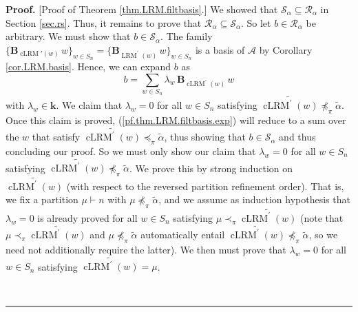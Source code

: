 \documentclass[submission]{FPSAC2026}
\newcommand{\kk}{\mathbf{k}} %
\newcommand{\cLRM}{\operatorname{cLRM}}
\newenvironment{proof}[1][Proof]{\noindent\textbf{#1.} }{\ \rule{0.5em}{0.5em}}
\begin{document}
\begin{proof}
[Proof of Theorem \ref{thm.LRM.filtbasis}.] We showed that $\mathcal{S}%
_{\alpha}\subseteq\mathcal{R}_{\alpha}$ in Section \ref{sec.rs}. Thus, it
remains to prove that $\mathcal{R}_{\alpha}\subseteq\mathcal{S}_{\alpha}$. So
let $b\in\mathcal{R}_{\alpha}$ be arbitrary. We must show that $b\in
\mathcal{S}_{\alpha}$.
The family $\{\mathbf{B}_{\cLRM'%
(w)}\,w\}_{w\in S_{n}}=\{\mathbf{B}_{\operatorname*{LRM}\nolimits^{\prime}%
(w)}\,w\}_{w\in S_{n}}$ is a basis of $\mathcal{A}$ by Corollary
\ref{cor.LRM.basis}. Hence, we can expand $b$ as%
\begin{equation}
b=\sum_{w\in S_{n}}\lambda_{w}\,\mathbf{B}_{\operatorname*{cLRM}%
\nolimits^{\prime}(w)}\,w\label{pf.thm.LRM.filtbasis.exp}%
\end{equation}
with $\lambda_{w}\in \kk$.
We claim that $\lambda_{w}=0$ for all $w\in S_{n}$ satisfying
$\widetilde{\operatorname{cLRM}^{\prime}(w)}\npreceq_{\pi}\widetilde{\alpha}$.
Once this claim is proved, (\ref{pf.thm.LRM.filtbasis.exp}) will reduce to a
sum over the $w$ that satisfy $\widetilde{\operatorname{cLRM}^{\prime}(w)}%
\preceq_{\pi}\widetilde{\alpha}$, thus showing that $b\in\mathcal{S}_{\alpha}$
and thus concluding our proof.
So we must only show our claim that $\lambda_{w}=0$ for all $w\in S_{n}$
satisfying $\widetilde{\operatorname{cLRM}^{\prime}(w)}\npreceq_{\pi
}\widetilde{\alpha}$. We prove this by strong induction on
$\widetilde{\operatorname{cLRM}^{\prime}(w)}$ (with respect to the reversed
partition refinement order). That is, we fix a partition $\mu\vdash n$ with
$\mu\npreceq_{\pi}\widetilde{\alpha}$, and we assume as induction hypothesis
that $\lambda_{w}=0$ is already proved for all $w\in S_{n}$ satisfying
$\mu\prec_{\pi}\widetilde{\operatorname{cLRM}^{\prime}(w)}$ (note that
$\mu\prec_{\pi}\widetilde{\operatorname{cLRM}^{\prime}(w)}$ and $\mu
\npreceq_{\pi}\widetilde{\alpha}$ automatically entail
$\widetilde{\operatorname{cLRM}^{\prime}(w)}\npreceq_{\pi}\widetilde{\alpha}$,
so we need not additionally require the latter). We then must prove that
$\lambda_{w}=0$ for all $w\in S_{n}$ satisfying
$\widetilde{\operatorname{cLRM}^{\prime}(w)}=\mu$.


\end{proof}
\end{document}
